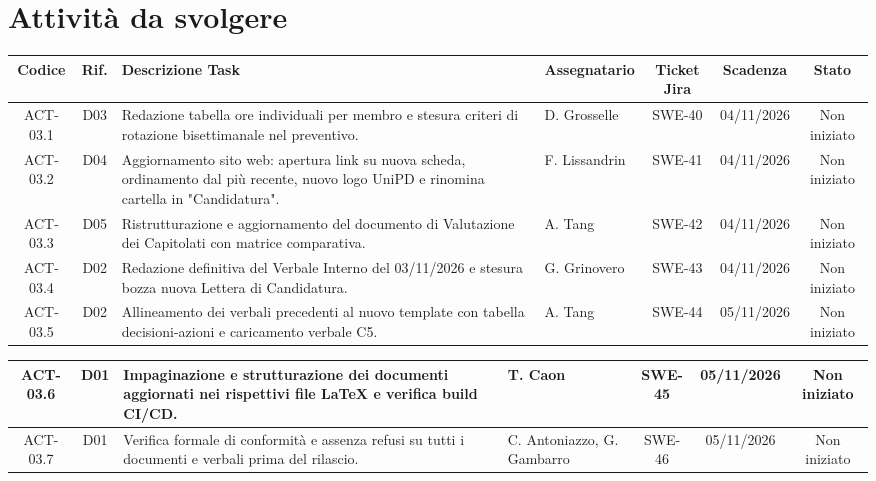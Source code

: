 \vspace{0.8cm}

\section{Attività da svolgere}
\renewcommand{\arraystretch}{1.3}
\noindent
\begin{tabularx}{\textwidth}{|c|c|>{\raggedright\arraybackslash}X|>{\raggedright\arraybackslash}p{2.8cm}|c|c|c|}
    \hline
    \textbf{Codice} & \textbf{Rif.} & \textbf{Descrizione Task} & \textbf{Assegnatario} & \textbf{Ticket Jira} & \textbf{Scadenza} & \textbf{Stato} \\
    \hline
    ACT-03.1 & D03 & Redazione tabella ore individuali per membro e stesura criteri di rotazione bisettimanale nel preventivo. & D. Grosselle & SWE-40 & 04/11/2026 & Non iniziato \\
    \hline
    ACT-03.2 & D04 & Aggiornamento sito web: apertura link su nuova scheda, ordinamento dal più recente, nuovo logo UniPD e rinomina cartella in "Candidatura". & F. Lissandrin & SWE-41 & 04/11/2026 & Non iniziato \\
    \hline
    ACT-03.3 & D05 & Ristrutturazione e aggiornamento del documento di Valutazione dei Capitolati con matrice comparativa. & A. Tang & SWE-42 & 04/11/2026 & Non iniziato \\
    \hline
    ACT-03.4 & D02 & Redazione definitiva del Verbale Interno del 03/11/2026 e stesura bozza nuova Lettera di Candidatura. & G. Grinovero & SWE-43 & 04/11/2026 & Non iniziato \\
    \hline
    ACT-03.5 & D02 & Allineamento dei verbali precedenti al nuovo template con tabella decisioni-azioni e caricamento verbale C5. & A. Tang & SWE-44 & 05/11/2026 & Non iniziato \\
    \hline
\end{tabularx}

\renewcommand{\arraystretch}{1.3}
\noindent
\begin{tabularx}{\textwidth}{|c|c|>{\raggedright\arraybackslash}X|>{\raggedright\arraybackslash}p{2.8cm}|c|c|c|}
    \hline
   ACT-03.6 & D01 & Impaginazione e strutturazione dei documenti aggiornati nei rispettivi file LaTeX e verifica build CI/CD. & T. Caon & SWE-45 & 05/11/2026 & Non iniziato \\
    \hline
    ACT-03.7 & D01 & Verifica formale di conformità e assenza refusi su tutti i documenti e verbali prima del rilascio. & C. Antoniazzo, G. Gambarro & SWE-46 & 05/11/2026 & Non iniziato \\
    \hline
\end{tabularx}
